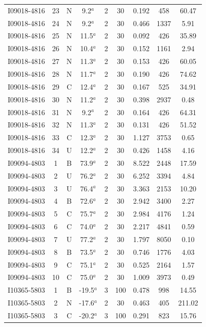 \begin{table}
\begin{tabular}{ccccccccc}
I09018-4816 & 23 & N & 9.2$^{a}$ & 2 & 30 & 0.192 & 458 & 60.47 \\
I09018-4816 & 24 & N & 9.2$^{a}$ & 2 & 30 & 0.466 & 1337 & 5.91 \\
I09018-4816 & 25 & N & 11.5$^{a}$ & 2 & 30 & 0.092 & 426 & 35.89 \\
I09018-4816 & 26 & N & 10.4$^{a}$ & 2 & 30 & 0.152 & 1161 & 2.94 \\
I09018-4816 & 27 & N & 11.3$^{a}$ & 2 & 30 & 0.153 & 426 & 60.05 \\
I09018-4816 & 28 & N & 11.7$^{a}$ & 2 & 30 & 0.190 & 426 & 74.62 \\
I09018-4816 & 29 & C & 12.4$^{a}$ & 2 & 30 & 0.167 & 525 & 34.91 \\
I09018-4816 & 30 & N & 11.2$^{a}$ & 2 & 30 & 0.398 & 2937 & 0.48 \\
I09018-4816 & 31 & N & 9.2$^{a}$ & 2 & 30 & 0.164 & 426 & 64.31 \\
I09018-4816 & 32 & N & 11.3$^{a}$ & 2 & 30 & 0.131 & 426 & 51.52 \\
I09018-4816 & 33 & C & 12.3$^{a}$ & 2 & 30 & 1.127 & 3753 & 0.65 \\
I09018-4816 & 34 & U & 12.2$^{a}$ & 2 & 30 & 0.426 & 1458 & 4.16 \\
I09094-4803 & 1 & B & 73.9$^{a}$ & 2 & 30 & 8.522 & 2448 & 17.59 \\
I09094-4803 & 2 & U & 76.2$^{a}$ & 2 & 30 & 6.252 & 3394 & 4.84 \\
I09094-4803 & 3 & U & 76.4$^{a}$ & 2 & 30 & 3.363 & 2153 & 10.20 \\
I09094-4803 & 4 & B & 72.6$^{a}$ & 2 & 30 & 2.942 & 3400 & 2.27 \\
I09094-4803 & 5 & C & 75.7$^{a}$ & 2 & 30 & 2.984 & 4176 & 1.24 \\
I09094-4803 & 6 & C & 74.0$^{a}$ & 2 & 30 & 2.217 & 4841 & 0.59 \\
I09094-4803 & 7 & U & 77.2$^{a}$ & 2 & 30 & 1.797 & 8050 & 0.10 \\
I09094-4803 & 8 & B & 73.5$^{a}$ & 2 & 30 & 0.746 & 1776 & 4.03 \\
I09094-4803 & 9 & C & 75.1$^{a}$ & 2 & 30 & 0.525 & 2164 & 1.57 \\
I09094-4803 & 10 & C & 75.0$^{a}$ & 2 & 30 & 1.009 & 3973 & 0.49 \\
I10365-5803 & 1 & B & -19.5$^{a}$ & 3 & 100 & 0.478 & 998 & 14.55 \\
I10365-5803 & 2 & N & -17.6$^{a}$ & 2 & 30 & 0.463 & 405 & 211.02 \\
I10365-5803 & 3 & C & -20.2$^{a}$ & 3 & 100 & 0.291 & 823 & 15.76 \\

\end{tabular}
\end{table}
